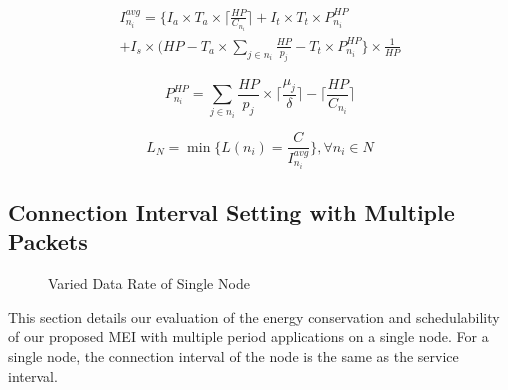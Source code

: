 \documentclass[10pt,journal,compsoc]{IEEEtran}
\begin{document}
\begin{multline}
    I^{avg}_{n_i}= \{I_{a} \times T_{a} \times \lceil\frac{HP}{C_{n_i}}\rceil + I_t \times T_t \times P^{HP}_{n_i}\\
     + I_{s} \times (HP- T_{a} \times \sum_{j \in {n_i}} \frac{HP}{p_j} -  T_t \times P^{HP}_{n_i}\}\times\frac{1}{HP} \label{equ:set_avg_conn}
\end{multline}

\begin{equation}
    P^{HP}_{n_i}= \sum_{j \in {n_i}} \frac{HP}{p_j}\times \lceil{\frac{\mu_j}{\delta}}\rceil-\lceil\frac{HP}{C_{n_i}}\rceil \label{equ:qt}
\end{equation}

\begin{equation}
    L_{N}= \min\{L(n_i)=\frac{C}{I_{n_i}^{avg}}\}, \forall n_i \in N \label{equ:set_lf}
\end{equation}

\subsection{Connection Interval Setting with Multiple Packets}\label{sec:exp-single}

\begin{figure*}[!tbhp]
\begin{minipage}[b]{\linewidth}
\vspace{-0.5em}
\centering
{}\vspace{-0.5em}
\caption{Varied Data Rate of Single Node} \label{fig:Exper_LF} %
\end{minipage}
\end{figure*}

This section details our evaluation of the energy conservation and schedulability of our proposed MEI with multiple period applications on a single node. For a single node, the connection interval of the node is the same as the service interval.
\end{document}
